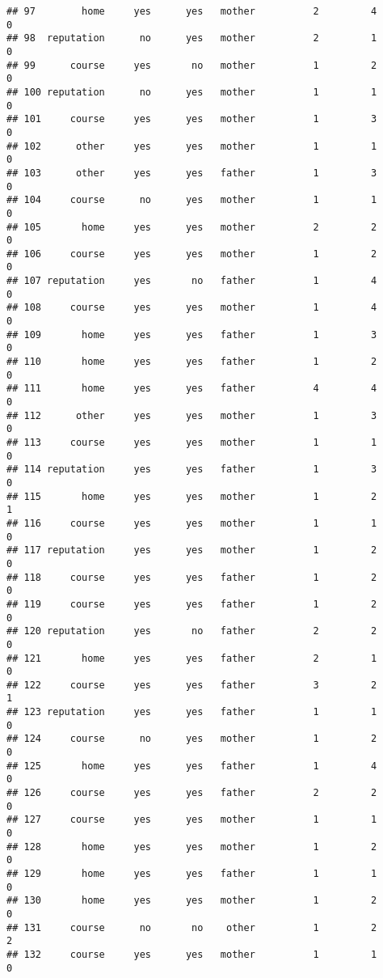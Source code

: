 \documentclass[]{article}
\begin{document}
\begin{verbatim}
## 97        home     yes      yes   mother          2         4        0
## 98  reputation      no      yes   mother          2         1        0
## 99      course     yes       no   mother          1         2        0
## 100 reputation      no      yes   mother          1         1        0
## 101     course     yes      yes   mother          1         3        0
## 102      other     yes      yes   mother          1         1        0
## 103      other     yes      yes   father          1         3        0
## 104     course      no      yes   mother          1         1        0
## 105       home     yes      yes   mother          2         2        0
## 106     course     yes      yes   mother          1         2        0
## 107 reputation     yes       no   father          1         4        0
## 108     course     yes      yes   mother          1         4        0
## 109       home     yes      yes   father          1         3        0
## 110       home     yes      yes   father          1         2        0
## 111       home     yes      yes   father          4         4        0
## 112      other     yes      yes   mother          1         3        0
## 113     course     yes      yes   mother          1         1        0
## 114 reputation     yes      yes   father          1         3        0
## 115       home     yes      yes   mother          1         2        1
## 116     course     yes      yes   mother          1         1        0
## 117 reputation     yes      yes   mother          1         2        0
## 118     course     yes      yes   father          1         2        0
## 119     course     yes      yes   father          1         2        0
## 120 reputation     yes       no   father          2         2        0
## 121       home     yes      yes   father          2         1        0
## 122     course     yes      yes   father          3         2        1
## 123 reputation     yes      yes   father          1         1        0
## 124     course      no      yes   mother          1         2        0
## 125       home     yes      yes   father          1         4        0
## 126     course     yes      yes   father          2         2        0
## 127     course     yes      yes   mother          1         1        0
## 128       home     yes      yes   mother          1         2        0
## 129       home     yes      yes   father          1         1        0
## 130       home     yes      yes   mother          1         2        0
## 131     course      no       no    other          1         2        2
## 132     course     yes      yes   mother          1         1        0

\end{verbatim}
\end{document}
